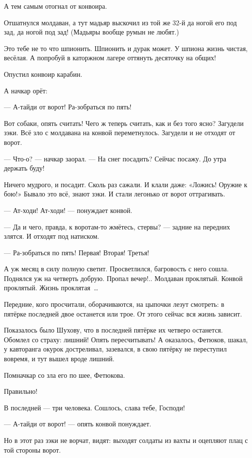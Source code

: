 А тем самым отогнал от конвоира.

Отшатнулся молдаван, а тут мадьяр выскочил из той же 32-й да ногой его под зад, да ногой под 
зад! (Мадьяры вообще румын не любят.)

Это тебе не то что шпионить. Шпионить и дурак может. У шпиона жизнь чистая, весёлая. А 
попробуй в каторжном лагере оттянуть десяточку на общих!

Опустил конвоир карабин.

А начкар орёт:

--- А-тайди от ворот! Ра-зобраться по пять!

Вот собаки, опять считать! Чего ж теперь считать, как и без того ясно? Загудели зэки. Всё зло с 
молдавана на конвой переметнулось. Загудели и не отходят от ворот.

--- Что-о? --- начкар заорал. --- На снег посадить? Сейчас посажу. До утра держать буду!

Ничего мудрого, и посадит. Сколь раз сажали. И клали даже: «Ложись! Оружие к бою!» Бывало это 
всё, знают зэки. И стали легонько от ворот оттрагивать.

--- Ат-ходи! Ат-ходи! --- понуждает конвой.

--- Да и чего, правда, к воротам-то жмётесь, стервы? --- задние на передних злятся. И отходят под 
натиском.

--- Ра-зобраться по пять! Первая! Вторая! Третья!

А уж месяц в силу полную светит. Просветлился, багровость с него сошла. Поднялся уж на 
четверть добрую. Пропал вечер!.. Молдаван проклятый. Конвой проклятый. Жизнь проклятая~\dots{}

Передние, кого просчитали, оборачиваются, на цыпочки лезут смотреть: в пятёрке последней 
двое останется или трое. От этого сейчас вся жизнь зависит.

Показалось было Шухову, что в последней пятёрке их четверо останется. Обомлел со страху: 
лишний! Опять пересчитывать! А оказалось, Фетюков, шакал, у кавторанга окурок достреливал, 
зазевался, в свою пятёрку не переступил вовремя, и тут вышел вроде лишний.

Помначкар со зла его по шее, Фетюкова.

Правильно!

В последней --- три человека. Сошлось, слава тебе, Господи!

--- А-тайди от ворот! --- опять конвой понуждает.

Но в этот раз зэки не ворчат, видят: выходят солдаты из вахты и оцепляют плац с той стороны 
ворот.

